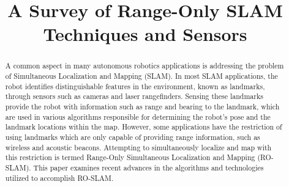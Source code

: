\documentclass[conference]{IEEEtran}
\begin{document}
	\title{A Survey of Range-Only SLAM Techniques and Sensors}
	
	\author{
	}
	
	
	
	
	
	
	
	
	
	
	\maketitle
	
	
	
	
	\begin{abstract}		
		A common aspect in many autonomous robotics applications is addressing the problem of Simultaneous Localization and Mapping (SLAM). In most SLAM applications, the robot identifies distinguishable features in the environment, known as landmarks, through sensors such as cameras and laser rangefinders. Sensing these landmarks provide the robot with information such as range and bearing to the landmark, which are used in various algorithms responsible for determining the robot's pose and the landmark locations within the map. However, some applications have the restriction of using landmarks which are only capable of providing range information, such as wireless and acoustic beacons. Attempting to simultaneously localize and map with this restriction is termed Range-Only Simultaneous Localization and Mapping (RO-SLAM). This paper examines recent advances in the algorithms and technologies utilized to accomplish RO-SLAM.
		
		
	\end{abstract}
	
\end{document}
